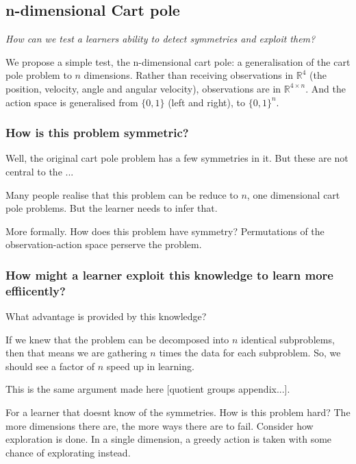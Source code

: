 \subsection{n-dimensional Cart pole}

\begin{displayquote}
  \textit{How can we test a learners ability to detect symmetries and exploit them?}
\end{displayquote}

We propose a simple test, the n-dimensional cart pole: a generalisation of the
cart pole problem to $n$ dimensions. Rather than receiving observations in
$\mathbb{R}^4$ (the position, velocity, angle and angular velocity), observations are
in $\mathbb{R}^{4\times n}$. And the action space is generalised from $\{0,1\}$ (left and right),
to $\{0,1\}^{n}$.

\cite{Brockman2016,baselines}



\subsubsection{How is this problem symmetric?}

Well, the original cart pole problem has a few symmetries in it. But these are
not central to the ...

Many people realise that this problem can be reduce to $n$, one dimensional cart pole problems.
But the learner needs to infer that.

More formally. How does this problem have symmetry?
Permutations of the observation-action space perserve the problem.

\subsubsection{How might a learner exploit this knowledge to learn more effiicently?}

What advantage is provided by this knowledge?

If we knew that the problem can be decomposed into $n$ identical subproblems,
then that means we are gathering $n$ times the data for each subproblem.
So, we should see a factor of $n$ speed up in learning.

This is the same argument made here [quotient groups appendix...].

For a learner that doesnt know of the symmetries. How is this problem hard?
The more dimensions there are, the more ways there are to fail.
Consider how exploration is done. In a single dimension, a greedy action is
taken with some chance of explorating instead.

